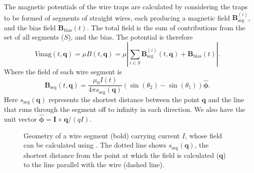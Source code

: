 The magnetic potentials of the wire traps are calculated by considering the
traps to be formed of segments of straight wires, each producing a magnetic
field $\mathbf{B}_\text{seg}^{(i)}$, and the bias field
$\mathbf{B}_\text{bias}(t)$.  The total field is the sum of contributions from
the set of all segments ($S$), and the bias. The potential is therefore
%
\begin{equation} V\text{mag}(t, \mathbf{q}) = \mu B (t, \mathbf{q}) = \mu
\left| \sum_{i\in S} \mathbf{B}_\text{seg}^{(i)}(t, \mathbf{q}) +
\mathbf{B}_\text{bias}(t)\right|.  \end{equation}
%
Where the field of each wire segment is~\cite{Griffiths2017}
%
\begin{equation} \mathbf{B}_\text{seg}(t, \mathbf{q}) = \frac{\mu_0 I(t)}{4\pi
s_\text{seg}(\mathbf{q})} (\sin(\theta_2)  -
\sin(\theta_1))\hat{\mathbf{\phi}}. \label{design:eq:segmentfield}
\end{equation}
%
Here $s_\text{seg}(\mathbf{q})$ represents the shortest distance between the
point $\mathbf{q}$ and the line that runs through the segment off to infinity
in each direction. We also have the unit vector $\hat{\mathbf{\phi}} =
\mathbf{I}\times\mathbf{q}/(qI)$.

\begin{figure}[h]
\centering
  \caption{Geometry of a wire segment (bold) carrying current $I$, whose field
  can be calculated using . The dotted line
  shows $s_\text{seg}(\mathbf{q})$, the shortest distance from the point at
  which the field is calculated ($\mathbf{q}$) to the line parallel with the
  wire (dashed line).
  }
  \label{design:fig:wiresegment}
\end{figure}

